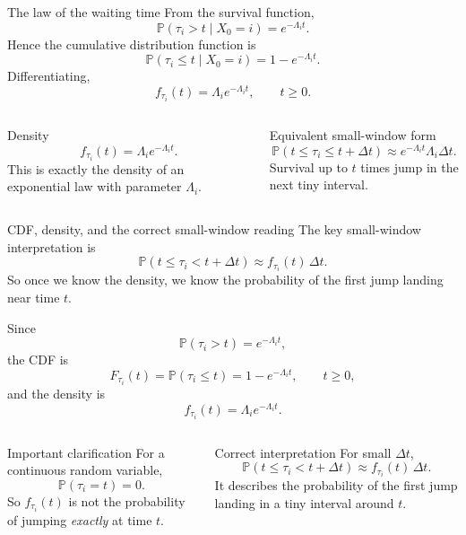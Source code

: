 \documentclass[aspectratio=169,professionalfonts]{beamer}
\newcommand{\Prob}{\mathbb{P}}
\begin{document}
\begin{frame}{The law of the waiting time}
\small
From the survival function,
\[
\Prob(\tau_i>t\mid X_0=i)=e^{-\Lambda_i t}.
\]
Hence the cumulative distribution function is
\[
\Prob(\tau_i\le t\mid X_0=i)=1-e^{-\Lambda_i t}.
\]
Differentiating,
\[
f_{\tau_i}(t)=\Lambda_i e^{-\Lambda_i t},\qquad t\ge 0.
\]

\begin{columns}[T,totalwidth=\textwidth]
\begin{block}{Density}
\[
f_{\tau_i}(t)=\Lambda_i e^{-\Lambda_i t}.
\]
This is exactly the density of an exponential law with parameter $\Lambda_i$.
\end{block}

\begin{alertblock}{Equivalent small-window form}
\[
\Prob(t\le \tau_i\le t+\Delta t)
\approx e^{-\Lambda_i t}\Lambda_i\Delta t.
\]
Survival up to $t$ times jump in the next tiny interval.
\end{alertblock}
\end{columns}
\end{frame}

\begin{frame}{CDF, density, and the correct small-window reading}
\scriptsize
The key small-window interpretation is
\[
\Prob(t\le \tau_i<t+\Delta t)\approx f_{\tau_i}(t)\,\Delta t.
\]
So once we know the density, we know the probability of the first jump landing near time $t$.

\vspace{0.05cm}
Since
\[
\Prob(\tau_i>t)=e^{-\Lambda_i t},
\]
the CDF is
\[
F_{\tau_i}(t)=\Prob(\tau_i\le t)=1-e^{-\Lambda_i t},
\qquad t\ge 0,
\]
and the density is
\[
f_{\tau_i}(t)=\Lambda_i e^{-\Lambda_i t}.
\]

\begin{columns}[T,totalwidth=\textwidth]
\begin{block}{Important clarification}
For a continuous random variable,
\[
\Prob(\tau_i=t)=0.
\]
So $f_{\tau_i}(t)$ is not the probability of jumping \emph{exactly} at time $t$.
\end{block}

\begin{alertblock}{Correct interpretation}
For small $\Delta t$,
\[
\Prob(t\le \tau_i<t+\Delta t)
\approx f_{\tau_i}(t)\,\Delta t.
\]
It describes the probability of the first jump landing in a tiny interval around $t$.
\end{alertblock}
\end{columns}
\end{frame}
\end{document}
